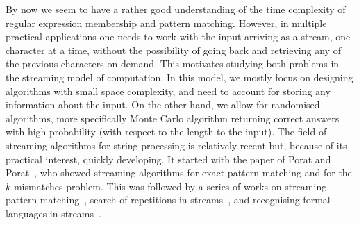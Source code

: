 By now we seem to have a rather good understanding of the time complexity of regular expression membership and pattern
matching. However, in multiple practical applications one needs to work with the input arriving as a stream, one character at a time,
without the possibility of going back and retrieving any of the previous characters on demand. This motivates studying
both problems in the streaming model
of computation. In this model, we mostly focus on designing algorithms with small space complexity, and need to account
for storing any information about the input. On the other hand, we allow for randomised algorithms, more specifically
Monte Carlo algorithm returning correct answers with high probability (with respect to the length to the input).
The field of streaming algorithms for string processing is relatively recent but, because of its practical interest, quickly developing.
It started with the paper of  Porat and Porat~\cite{Porat:09}, who showed streaming algorithms for exact pattern matching and for the $k$-mismatches problem. This was followed by a series of works on streaming pattern matching~\cite{DBLP:journals/talg/BreslauerG14,DBLP:conf/esa/CliffordFPSS15,DBLP:conf/esa/GolanP17, DBLP:conf/soda/CliffordFPSS16, starikovskaya:LIPIcs:2017:7320, DBLP:conf/icalp/GolanKP18, gawrychowski_et_al:LIPIcs:2019:10492,clifford2018streaming,DBLP:conf/cpm/GolanKKP20, DBLP:journals/iandc/RadoszewskiS20,DBLP:journals/corr/abs-2106-06037}, search of repetitions in streams~\cite{Ergun:10,stream-periodicity-mismatches, stream-periodicity-wildcards,DBLP:journals/algorithmica/GawrychowskiMSU19, DBLP:conf/cpm/MerkurevS19, DBLP:conf/spire/MerkurevS19, DBLP:conf/cpm/GawrychowskiRS19}, and recognising formal languages in streams~\cite{DBLP:journals/siamcomp/MagniezMN14,ganardi_et_al:LIPIcs:2018:9131, DBLP:conf/lata/GanardiHL18, ganardi_et_al:LIPIcs:2018:8485, ganardi_et_al:LIPIcs:2016:6853, DBLP:conf/mfcs/GanardiJL18, DBLP:journals/tcs/BabuLRV13, franois_et_al:LIPIcs:2016:6355,ganardi_et_al:LIPIcs:2019:11502,bathie_et_al:LIPIcs.ICALP.2021.119}. 

